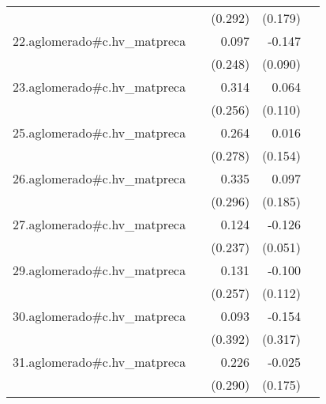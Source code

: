 {\begin{longtable}{l*{4}{D{.}{.}{-1}}}
            &                     &     (0.292)         &     (0.179)         &                     \\
\addlinespace
22.aglomerado#c.hv\_matpreca&                     &       0.097         &      -0.147         &                     \\
            &                     &     (0.248)         &     (0.090)         &                     \\
\addlinespace
23.aglomerado#c.hv\_matpreca&                     &       0.314         &       0.064         &                     \\
            &                     &     (0.256)         &     (0.110)         &                     \\
\addlinespace
25.aglomerado#c.hv\_matpreca&                     &       0.264         &       0.016         &                     \\
            &                     &     (0.278)         &     (0.154)         &                     \\
\addlinespace
26.aglomerado#c.hv\_matpreca&                     &       0.335         &       0.097         &                     \\
            &                     &     (0.296)         &     (0.185)         &                     \\
\addlinespace
27.aglomerado#c.hv\_matpreca&                     &       0.124         &      -0.126\sym{*}  &                     \\
            &                     &     (0.237)         &     (0.051)         &                     \\
\addlinespace
29.aglomerado#c.hv\_matpreca&                     &       0.131         &      -0.100         &                     \\
            &                     &     (0.257)         &     (0.112)         &                     \\
\addlinespace
30.aglomerado#c.hv\_matpreca&                     &       0.093         &      -0.154         &                     \\
            &                     &     (0.392)         &     (0.317)         &                     \\
\addlinespace
31.aglomerado#c.hv\_matpreca&                     &       0.226         &      -0.025         &                     \\
            &                     &     (0.290)         &     (0.175)         &                     \\

\end{longtable}}

